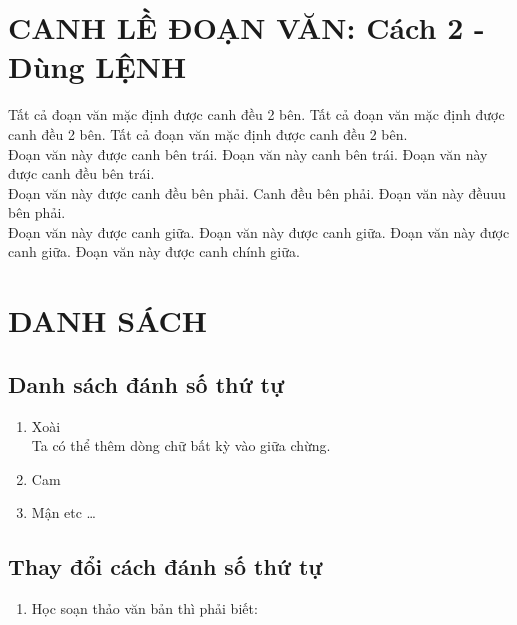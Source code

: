\documentclass{article}
\begin{document}
\section{CANH LỀ ĐOẠN VĂN: Cách 2 - Dùng LỆNH}
\begin{minipage}{2.4in}

Tất cả đoạn văn mặc định được canh đều 2 bên. Tất cả đoạn văn mặc định được canh đều 2 bên. Tất cả đoạn văn mặc định được canh đều 2 bên.\\

Đoạn văn này được canh bên trái. Đoạn văn này canh bên trái. Đoạn văn này được canh đều bên trái.\\

Đoạn văn này được canh đều bên phải. Canh đều bên phải. Đoạn văn này đềuuu bên phải. \\

Đoạn văn này được canh giữa. Đoạn văn này được canh giữa. Đoạn văn này được canh giữa. Đoạn văn này được canh chính giữa.
\end{minipage}

\section{DANH SÁCH}
\subsection{Danh sách đánh số thứ tự}
\begin{enumerate}
	\item Xoài\\
		Ta có thể thêm dòng chữ bất kỳ vào giữa chừng.
	\item Cam
	\item Mận etc \ldots
\end{enumerate}

\subsection{Thay đổi cách đánh số thứ tự}

\begin{enumerate}
	\item Học soạn thảo văn bản thì phải biết:
\end{enumerate}
\end{document}
